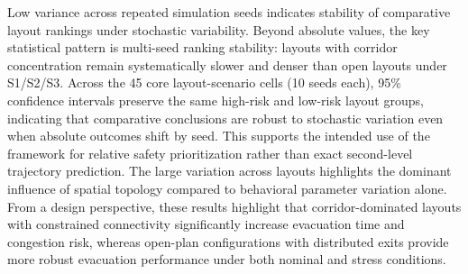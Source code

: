 \documentclass[utf8]{FrontiersinHarvard}
\begin{document}
Low variance across repeated simulation seeds indicates stability of comparative layout rankings under stochastic variability.
Beyond absolute values, the key statistical pattern is multi-seed ranking stability: layouts with corridor concentration remain systematically slower and denser than open layouts under S1/S2/S3. Across the 45 core layout-scenario cells (10 seeds each), 95\% confidence intervals preserve the same high-risk and low-risk layout groups, indicating that comparative conclusions are robust to stochastic variation even when absolute outcomes shift by seed. This supports the intended use of the framework for relative safety prioritization rather than exact second-level trajectory prediction.
The large variation across layouts highlights the dominant influence of spatial topology compared to behavioral parameter variation alone. From a design perspective, these results highlight that corridor-dominated layouts with constrained connectivity significantly increase evacuation time and congestion risk, whereas open-plan configurations with distributed exits provide more robust evacuation performance under both nominal and stress conditions.
\end{document}
